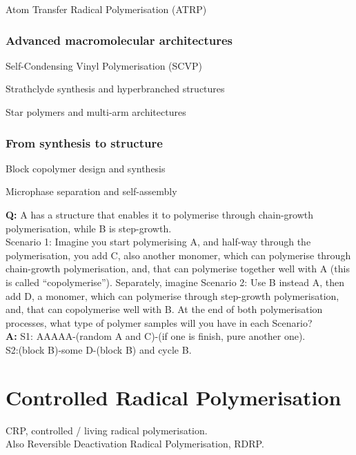 \documentclass{NoteThesis/note-thesis}
\begin{document}
Atom Transfer Radical Polymerisation (ATRP)

\subsubsection*{Advanced macromolecular architectures}

Self-Condensing Vinyl Polymerisation (SCVP)

Strathclyde synthesis and hyperbranched structures

Star polymers and multi-arm architectures

\subsubsection*{From synthesis to structure}

Block copolymer design and synthesis

Microphase separation and self-assembly

\begin{mynote_env}[frametitle=Introductory Discussions I]
    \textbf{Q:} A has a structure that enables it to polymerise through chain-growth polymerisation, while B is step-growth.\\ Scenario 1: Imagine you start polymerising A, and half-way through the polymerisation, you add C, also another monomer, which can polymerise through chain-growth polymerisation, and, that can polymerise together well with A (this is called “copolymerise”). Separately, imagine Scenario 2: Use B instead A, then add D, a monomer, which can polymerise through step-growth polymerisation, and, that can copolymerise well with B. At the end of both polymerisation processes, what type of polymer samples will you have in each Scenario?\\
    \textbf{A:} S1: AAAAA-(random A and C)-(if one is finish, pure another one).\\ S2:(block B)-some D-(block B) and cycle B.
\end{mynote_env}

\section{Controlled Radical Polymerisation}

\begin{mynote_env}[frametitle=Note]
    CRP, controlled / living radical polymerisation. \\Also Reversible Deactivation Radical Polymerisation, RDRP.
\end{mynote_env}
\end{document}

